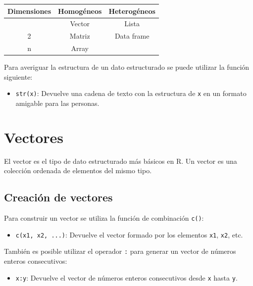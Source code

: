 \documentclass[
  a4paper,
]{scrreport}
\providecommand{\tightlist}{%
  \setlength{\itemsep}{0pt}\setlength{\parskip}{0pt}}\usepackage{longtable,booktabs,array}
\theoremstyle{definition}
\theoremstyle{definition}
\theoremstyle{remark}
\begin{document}
\begin{longtable}[]{@{}ccc@{}}
\toprule\noalign{}
Dimensiones & Homogéneos & Heterogéneos \\
\midrule\noalign{}
\endhead
\bottomrule\noalign{}
\endlastfoot
1 & Vector & Lista \\
2 & Matriz & Data frame \\
n & Array & \\
\end{longtable}

Para averiguar la estructura de un dato estructurado se puede utilizar
la función siguiente:

\begin{itemize}
\tightlist
\item
  \texttt{str(x)}: Devuelve una cadena de texto con la estructura de
  \texttt{x} en un formato amigable para las personas.
\end{itemize}

\section{Vectores}\label{vectores}

El vector es el tipo de dato estructurado más básicos en R. Un vector es
una colección ordenada de elementos del mismo tipo.

\subsection{Creación de vectores}\label{creaciuxf3n-de-vectores}

Para construir un vector se utiliza la función de combinación
\texttt{c()}:

\begin{itemize}
\tightlist
\item
  \texttt{c(x1,\ x2,\ ...)}: Devuelve el vector formado por los
  elementos \texttt{x1}, \texttt{x2}, etc.
\end{itemize}

También es posible utilizar el operador \texttt{:} para generar un
vector de números enteros consecutivos:

\begin{itemize}
\tightlist
\item
  \texttt{x:y}: Devuelve el vector de números enteros consecutivos desde
  \texttt{x} hasta \texttt{y}.
\end{itemize}
\end{document}
